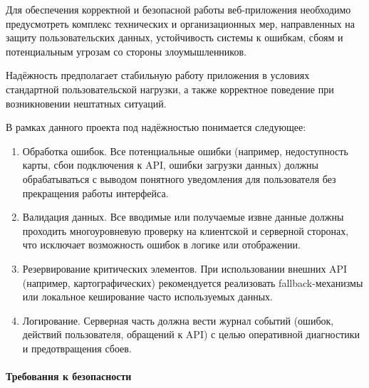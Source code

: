 Для обеспечения корректной и безопасной работы веб-приложения необходимо предусмотреть комплекс технических и организационных мер\cite{b10}, направленных на защиту пользовательских данных, устойчивость системы к ошибкам, сбоям и потенциальным угрозам со стороны злоумышленников.

Надёжность предполагает стабильную работу приложения в условиях стандартной пользовательской нагрузки, а также корректное поведение при возникновении нештатных ситуаций.

В рамках данного проекта под надёжностью понимается следующее:
\begin{enumerate}
	\item Обработка ошибок.	Все потенциальные ошибки (например, недоступность карты, сбои подключения к API, ошибки загрузки данных) должны обрабатываться с выводом понятного уведомления для пользователя без прекращения работы интерфейса.
	\item Валидация данных.	Все вводимые или получаемые извне данные должны проходить многоуровневую проверку на клиентской и серверной сторонах, что исключает возможность ошибок в логике или отображении.
	\item Резервирование критических элементов.	При использовании внешних API (например, картографических) рекомендуется реализовать fallback-механизмы или локальное кеширование часто используемых данных.
	\item Логирование. Серверная часть должна вести журнал событий (ошибок, действий пользователя, обращений к API) с целью оперативной диагностики и предотвращения сбоев.
\end{enumerate}

\paragraph{Требования к безопасности}

